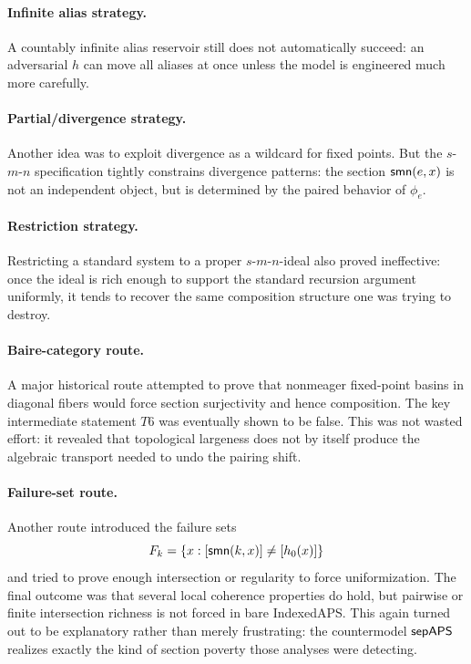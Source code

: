 \documentclass[11pt]{article}
\begin{document}
\paragraph{Infinite alias strategy.}
A countably infinite alias reservoir still does not automatically succeed: an adversarial \(h\) can move all aliases at once unless the model is engineered much more carefully.

\paragraph{Partial/divergence strategy.}
Another idea was to exploit divergence as a wildcard for fixed points.  But the \(s\)-\(m\)-\(n\) specification tightly constrains divergence patterns: the section \(\mathsf{smn}(e,x)\) is not an independent object, but is determined by the paired behavior of \(\phi_e\).

\paragraph{Restriction strategy.}
Restricting a standard system to a proper \(s\)-\(m\)-\(n\)-ideal also proved ineffective: once the ideal is rich enough to support the standard recursion argument uniformly, it tends to recover the same composition structure one was trying to destroy.

\paragraph{Baire-category route.}
A major historical route attempted to prove that nonmeager fixed-point basins in diagonal fibers would force section surjectivity and hence composition.  The key intermediate statement \(T6\) was eventually shown to be false.  This was not wasted effort: it revealed that topological largeness does not by itself produce the algebraic transport needed to undo the pairing shift.

\paragraph{Failure-set route.}
Another route introduced the failure sets
\[
F_k = \{x : [\mathsf{smn}(k,x)] \neq [h_0(x)]\}
\]
and tried to prove enough intersection or regularity to force uniformization.  The final outcome was that several local coherence properties do hold, but pairwise or finite intersection richness is not forced in bare IndexedAPS.  This again turned out to be explanatory rather than merely frustrating: the countermodel \(\mathsf{sepAPS}\) realizes exactly the kind of section poverty those analyses were detecting.
\end{document}
